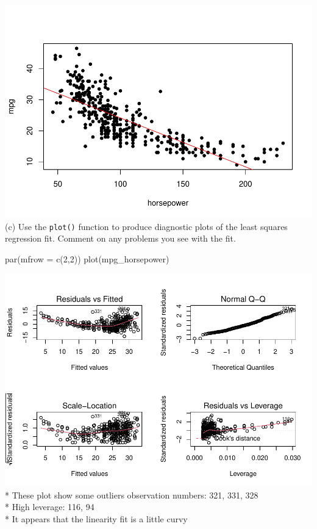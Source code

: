 \documentclass[
]{article}
\newenvironment{Shaded}{\begin{snugshade}}{\end{snugshade}}
\newcommand{\AttributeTok}[1]{\textcolor[rgb]{0.77,0.63,0.00}{#1}}
\newcommand{\DecValTok}[1]{\textcolor[rgb]{0.00,0.00,0.81}{#1}}
\newcommand{\FunctionTok}[1]{\textcolor[rgb]{0.00,0.00,0.00}{#1}}
\newcommand{\NormalTok}[1]{#1}
\begin{document}
\includegraphics{math4322_fall21_hw2_files/figure-latex/unnamed-chunk-7-1.pdf}
(c) Use the \texttt{plot()} function to produce diagnostic plots of the
least squares regression fit. Comment on any problems you see with the
fit.

\begin{Shaded}
\begin{Highlighting}[]
\FunctionTok{par}\NormalTok{(}\AttributeTok{mfrow =} \FunctionTok{c}\NormalTok{(}\DecValTok{2}\NormalTok{,}\DecValTok{2}\NormalTok{))}
\FunctionTok{plot}\NormalTok{(mpg\_horsepower)}
\end{Highlighting}
\end{Shaded}

\includegraphics{math4322_fall21_hw2_files/figure-latex/unnamed-chunk-8-1.pdf}
* These plot show some outliers observation numbers: 321, 331, 328\\
* High leverage: 116, 94\\
* It appears that the linearity fit is a little curvy
\end{document}
